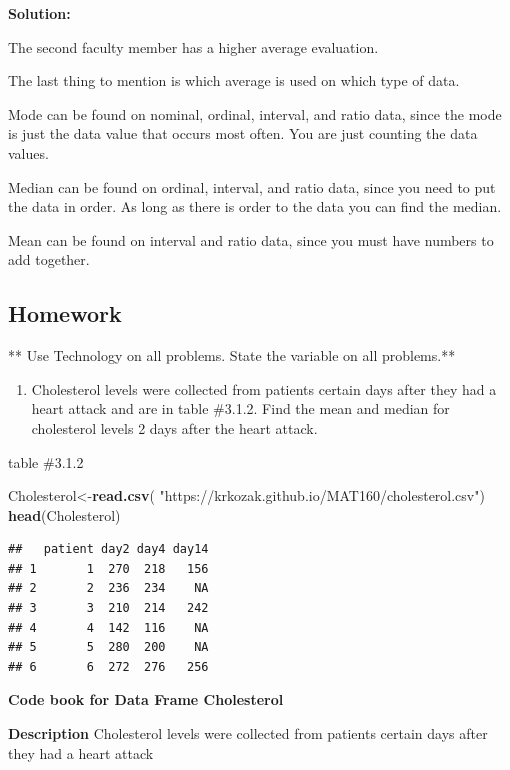 \documentclass[
]{book}
\newenvironment{Shaded}{\begin{snugshade}}{\end{snugshade}}
\newcommand{\KeywordTok}[1]{\textcolor[rgb]{0.13,0.29,0.53}{\textbf{#1}}}
\newcommand{\NormalTok}[1]{#1}
\newcommand{\StringTok}[1]{\textcolor[rgb]{0.31,0.60,0.02}{#1}}
\providecommand{\tightlist}{%
  \setlength{\itemsep}{0pt}\setlength{\parskip}{0pt}}
\begin{document}
\textbf{Solution:}

The second faculty member has a higher average evaluation.

The last thing to mention is which average is used on which type of data.

Mode can be found on nominal, ordinal, interval, and ratio data, since the mode is just the data value that occurs most often. You are just counting the data values.

Median can be found on ordinal, interval, and ratio data, since you need to put the data in order. As long as there is order to the data you can find the median.

Mean can be found on interval and ratio data, since you must have numbers to add together.

\hypertarget{homework-3}{%
\subsection{Homework}\label{homework-3}}

** Use Technology on all problems. State the variable on all problems.**

\begin{enumerate}
\def\labelenumi{\arabic{enumi}.}
\tightlist
\item
  Cholesterol levels were collected from patients certain days after they had a heart attack and are in table \#3.1.2. Find the mean and median for cholesterol levels 2 days after the heart attack.
\end{enumerate}

table \#3.1.2

\begin{Shaded}
\begin{Highlighting}[]
\NormalTok{Cholesterol<-}\KeywordTok{read.csv}\NormalTok{(}
  \StringTok{"https://krkozak.github.io/MAT160/cholesterol.csv"}\NormalTok{)}
\KeywordTok{head}\NormalTok{(Cholesterol)}
\end{Highlighting}
\end{Shaded}

\begin{verbatim}
##   patient day2 day4 day14
## 1       1  270  218   156
## 2       2  236  234    NA
## 3       3  210  214   242
## 4       4  142  116    NA
## 5       5  280  200    NA
## 6       6  272  276   256
\end{verbatim}

\textbf{Code book for Data Frame Cholesterol}

\textbf{Description}
Cholesterol levels were collected from patients certain days after they had a heart attack
\end{document}

